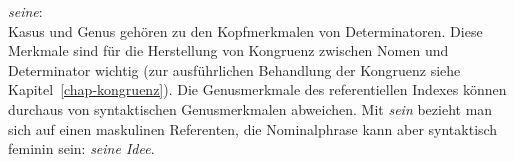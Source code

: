 \eas
\label{le-seine}
\textit{seine}:\\
\zs
Kasus und Genus gehören zu den Kopfmerkmalen von Determinatoren. Diese Merkmale sind
für die Herstellung von Kongruenz zwischen Nomen und Determinator wichtig (zur ausführlichen
Behandlung der Kongruenz siehe Kapitel~\ref{chap-kongruenz}). Die Genusmerkmale
des referentiellen Indexes können durchaus von syntaktischen Genusmerkmalen abweichen.
Mit \emph{sein} bezieht man sich auf einen maskulinen Referenten, die Nominalphrase
kann aber syntaktisch feminin sein: \emph{seine Idee}. 




